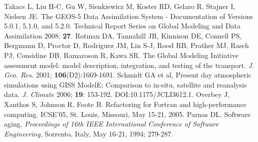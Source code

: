 \documentclass[11pt]{article}
\begin{document}
\begin{thebibliography}{99}
    Takacs L, Liu H-C, Gu W, Sienkiewicz M, Koster RD, Gelaro R, Stajner I, Nielsen JE.
    The GEOS-5 Data Assimilation System - Documentation of Versions 5.0.1, 5.1.0, and 5.2.0.
    Technical Report Series on Global Modeling and Data Assimilation 2008; {\bf 27}.
%
 Rotman DA, Tannahill JR, Kinnison DE,
    Connell PS, Bergmann D, Proctor D, Rodriguez JM, Lin S-J,
    Rood RB, Prather MJ, Rasch PJ, Considine DB, Ramaroson R, Kawa SR.
    The {G}lobal {M}odeling {I}nitiative assessment model:
    model description, integration, and testing of the transport.
    {\em J. Geo. Res.} 2001; {\bf 106}(D2):1669-1691.
%
 Schmidt GA et al,
   Present day atmospheric simulations using GISS ModelE: Comparison to in-situ, 
   satellite and reanalysis data.
   {\em J. Climate} 2006; {\bf 19}: 153-192. DOI:10.1175/JCLI3612.1.
%
 Overbey J, Xanthos S, Johnson R, Foote B.
    Refactoring for Fortran and high-performance computing.
    ICSE'05, St. Louis, Missouri, May 15-21, 2005.
%
 Parnas DL.
    Software aging.
    {\em Proceedings of 16th IEEE International Conference of Software Engineering},
    Sorrento, Italy, May 16-21, 1994; 279-287.
\end{thebibliography}
\end{document}
